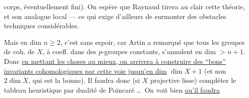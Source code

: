 
corps, éventuellement fini). On espère que Raynaud tirera au clair cette théorie, et son analogue local --- ce qui exige d'ailleurs de surmonter des obstacles techniques considérables.

Mais en dim $n\geq 2$, c'est sans espoir, car Artin a remarqué que tous les  groupes de coh. de $X$, à coeff. dans des $p$-groupes constants, s'annulent en dim $>n+1$. Donc \uline{en mettant les choses au mieux, on arrivera à construire des ``bons'' invariants cohomologiques par cette voie jusqu'en dim} $\dim X+1$ (et non $2\dim X$, qui est la bonne). Il faudra donc (si $X$ projective lisse)  compléter le tableau  heuristique par dualité de Poincaré \ldots\ On voit bien \uline{qu'il faudra}

